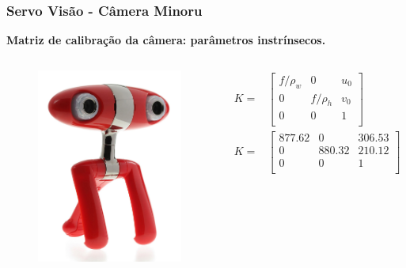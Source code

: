 \documentclass{beamer}
\newcommand\m[1]{\begin{bmatrix}#1\end{bmatrix}}
\begin{document}
\begin{frame}
\frametitle{Servo Visão - Câmera Minoru}
\textbf{Matriz de calibração da câmera:  parâmetros instrínsecos.}
\begin{columns}[c] %
\begin{figure}
\includegraphics[width=0.5\linewidth]{./img/minoru.jpg}
\end{figure}
\begin{align*}
{K} =& \m {
	f/\rho_w & 0 & u_0 \\
	0        & f/\rho_h &v_0 \\
	0 & 0 & 1 \\
}
\\
{K} =& 
\m{
	877.62 	& 0 		& 306.53 \\
	0  		& 880.32 	& 210.12 \\
	0   	& 0 		& 1 \\	
}	
\end{align*}

\end{columns}
\end{frame}
\end{document}
